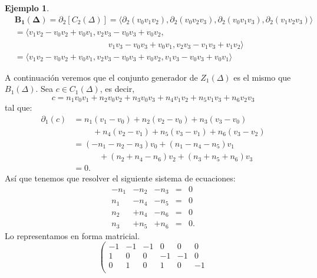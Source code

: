 \documentclass[12pt]{book}
\theoremstyle{definition}
\newtheorem{example}[theorem]{Ejemplo}
\newcounter{in}
\begin{document}
\begin{example}
\begin{align}
    \label{generadores-B1}
    &\boldsymbol{B_{1}(\Delta)}=\partial_{2}[C_{2}(\Delta)]=\langle\partial_{2}(v_{0}v_{1}v_{2}),\partial_{2}(v_{0}v_{2}v_{3}),\partial_{2}(v_{0}v_{1}v_{3}),\partial_{2}
    (v_{1}v_{2}v_{3})\rangle \nonumber\\
    &=\langle v_{1}v_{2}-v_{0}v_{2}+v_{0}v_{1},v_{2}v_{3}-v_{0}v_{3}+v_{0}v_{2},\nonumber\\
    &\phantom{{}=v_{1}v_{2}-v_{0}v_{2}+v_{0}v_{1},v_{2}v_{3}}v_{1}v_{3}-v_{0}v_{3}+v_{0}v_{1},v_{2}v_{3}-v_{1}v_{3}+v_{1}v_{2}\rangle\nonumber\\
    &=\langle v_{1}v_{2}-v_{0}v_{2}+v_{0}v_{1},v_{2}v_{3}-v_{0}v_{3}+v_{0}v_{2},v_{1}v_{3}-v_{0}v_{3}+v_{0}v_{1}\rangle
  \end{align} 
 
  A continuación veremos que el conjunto generador de $Z_{1}(\Delta)$
  es el mismo que $B_{1}(\Delta)$. Sea $c\in C_{1}(\Delta)$, es decir,
 $$c=n_{1}v_{0}v_{1}+n_{2}v_{0}v_{2}+n_{3}v_{0}v_{3}+n_{4}v_{1}v_{2}+n_{5}v_{1}v_{3}+n_{6}v_{2}v_{3}$$
 tal que:
 \begin{align*}
   \partial_{1}(c)&=n_{1}(v_{1}-v_{0})+n_{2}(v_{2}-v_{0})+n_{3}(v_{3}-v_{0})\\
   &\phantom{{}=n_{1}}+n_{4}(v_{2}-v_{1})+n_{5}(v_{3}-v_{1})+n_{6}(v_{3}-v_{2})\\
   &=(-n_{1}-n_{2}-n_{3})v_{0}+(n_{1}-n_{4}-n_{5})v_{1}\\
   &\phantom{{}=-n_{1}}+(n_{2}+n_{4}-n_{6})v_{2}+(n_{3}+n_{5}+n_{6})v_{3}\\
   &=0.
 \end{align*}
 Así que tenemos que resolver el siguiente sistema de ecuaciones:
 \[\begin{array}{rrrrr}
   -n_{1} & -n_{2} & -n_{3} & = & 0 \\
   n_{1} & -n_{4} & -n_{5} & = & 0 \\
   n_{2} & +n_{4} & -n_{6} & = & 0 \\
   n_{3} & +n_{5} & +n_{6} & = & 0. 
 \end{array}\]
 Lo representamos en forma matricial.
 \[ \left(
   \begin{array}{rrrrrr}
     -1  & -1    & -1   & 0    & 0     & 0 \\
     1   & 0     &    0 & -1   & -1    & 0 \\
     0   & 1     &    0 & 1   & 0    & -1 \\

\end{array}\]
\end{example}
\end{document}
